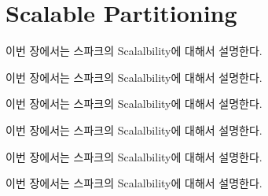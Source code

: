 \section{Scalable Partitioning}
\ifkor
이번 장에서는 스파크의 Scalalbility에 대해서 설명한다.
\else

\fi

\ifkor
이번 장에서는 스파크의 Scalalbility에 대해서 설명한다.
\else

\fi

\ifkor
이번 장에서는 스파크의 Scalalbility에 대해서 설명한다.
\else

\fi


\ifkor
이번 장에서는 스파크의 Scalalbility에 대해서 설명한다.
\else

\fi

\ifkor
이번 장에서는 스파크의 Scalalbility에 대해서 설명한다.
\else

\fi



\ifkor
이번 장에서는 스파크의 Scalalbility에 대해서 설명한다.
\else

